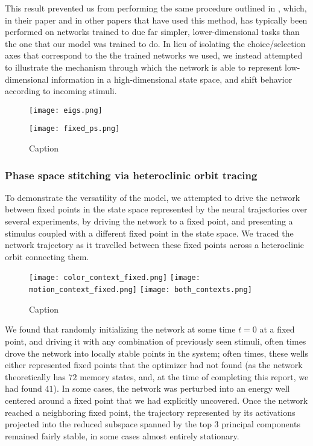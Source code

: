 \documentclass[12pt,a4paper,final]{iopart}
\begin{document}
This result prevented us from performing the same procedure outlined in \cite{BarakSussillo}, which, in their paper and in other papers that have used this method, has typically been performed on networks trained to due far simpler, lower-dimensional tasks than the one that our model was trained to do. In lieu of isolating the choice/selection axes that correspond to the the trained networks we used, we instead attempted to illustrate the mechanism through which the network is able to represent low-dimensional information in a high-dimensional state space, and shift behavior according to incoming stimuli.

\begin{figure}
    \centering
    \begin{minipage}{0.49\linewidth}
        \centering
        \texttt{[image: eigs.png]}
    \end{minipage}
    \begin{minipage}{0.49\linewidth}
        \centering
        \texttt{[image: fixed\_ps.png]}
    \end{minipage}
    \caption{Caption}
    \label{fig:my_label}
\end{figure}

\subsubsection{Phase space stitching via heteroclinic orbit tracing}
To demonstrate the versatility of the model, we attempted to drive the network between fixed points in the state space represented by the neural trajectories over several experiments, by driving the network to a fixed point, and presenting a stimulus coupled with a different fixed point in the state space. We traced the network trajectory as it travelled between these fixed points across a heteroclinic orbit connecting them.

\begin{figure}
    \centering
    \texttt{[image: color\_context\_fixed.png]}
    \texttt{[image: motion\_context\_fixed.png]}
    \texttt{[image: both\_contexts.png]}
    \caption{Caption}
    \label{fig:my_label}
\end{figure}

We found that randomly initializing the network at some time $t=0$ at a fixed point, and driving it with any combination of previously seen stimuli, often times drove the network into locally stable points in the system; often times, these wells either represented fixed points that the optimizer had not found (as the network theoretically has $72$ memory states, and, at the time of completing this report, we had found $41$). In some cases, the network was perturbed into an energy well centered around a fixed point that we had explicitly uncovered. Once the network reached a neighboring fixed point, the trajectory represented by its activations projected into the reduced subspace spanned by the top $3$ principal components remained fairly stable, in some cases almost entirely stationary.
\end{document}
